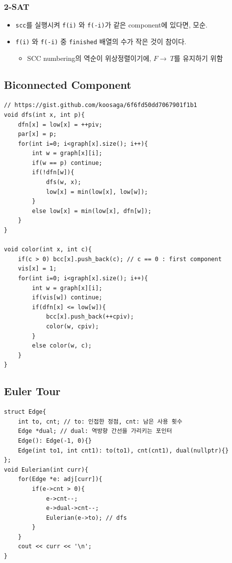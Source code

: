 \documentclass[landscape, 8pt, a4paper, oneside, twocolumn]{extarticle}
\begin{document}
\subsubsection{2-SAT}
\begin{itemize}
    \item \texttt{scc}를 실행시켜 \texttt{f(i)} 와 \texttt{f(-i)}가 같은 component에 있다면, 모순.
    \item \texttt{f(i)} 와 \texttt{f(-i)} 중 \texttt{finished} 배열의 수가 작은 것이 참이다.
    \begin{itemize}
    \item SCC numbering의 역순이 위상정렬이기에, $ F \to\ T$를 유지하기 위함
    \end{itemize}
\end{itemize}
\subsection{Biconnected Component}
\begin{verbatim}
// https://gist.github.com/koosaga/6f6fd50dd7067901f1b1
void dfs(int x, int p){
    dfn[x] = low[x] = ++piv;
    par[x] = p;
    for(int i=0; i<graph[x].size(); i++){
        int w = graph[x][i];
        if(w == p) continue;
        if(!dfn[w]){
            dfs(w, x);
            low[x] = min(low[x], low[w]);
        }
        else low[x] = min(low[x], dfn[w]);
    }
}

void color(int x, int c){
    if(c > 0) bcc[x].push_back(c); // c == 0 : first component
    vis[x] = 1;
    for(int i=0; i<graph[x].size(); i++){
        int w = graph[x][i];
        if(vis[w]) continue;
        if(dfn[x] <= low[w]){
            bcc[x].push_back(++cpiv);
            color(w, cpiv);
        }
        else color(w, c);
    }
}
\end{verbatim}
\subsection{Euler Tour}
\begin{verbatim}
struct Edge{
    int to, cnt; // to: 인접한 정점, cnt: 남은 사용 횟수
    Edge *dual; // dual: 역방향 간선을 가리키는 포인터
    Edge(): Edge(-1, 0){}
    Edge(int to1, int cnt1): to(to1), cnt(cnt1), dual(nullptr){}
};
void Eulerian(int curr){
    for(Edge *e: adj[curr]){
        if(e->cnt > 0){
            e->cnt--;
            e->dual->cnt--;
            Eulerian(e->to); // dfs
        }
    }
    cout << curr << '\n';
}
\end{verbatim}
\end{document}
